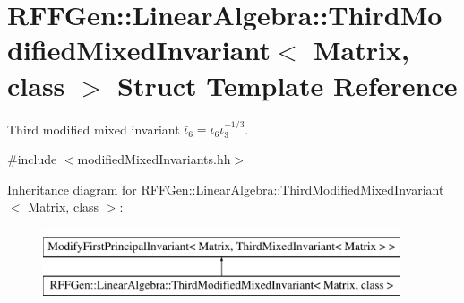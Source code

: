 \hypertarget{structRFFGen_1_1LinearAlgebra_1_1ThirdModifiedMixedInvariant}{\section{R\-F\-F\-Gen\-:\-:Linear\-Algebra\-:\-:Third\-Modified\-Mixed\-Invariant$<$ Matrix, class $>$ Struct Template Reference}
\label{structRFFGen_1_1LinearAlgebra_1_1ThirdModifiedMixedInvariant}
}


Third modified mixed invariant $\bar\iota_6=\iota_6\iota_3^{-1/3}$.  




{\ttfamily \#include $<$modified\-Mixed\-Invariants.\-hh$>$}

Inheritance diagram for R\-F\-F\-Gen\-:\-:Linear\-Algebra\-:\-:Third\-Modified\-Mixed\-Invariant$<$ Matrix, class $>$\-:\begin{figure}[H]
\begin{center}
\leavevmode
\includegraphics[height=2.000000cm]{structRFFGen_1_1LinearAlgebra_1_1ThirdModifiedMixedInvariant}
\end{center}
\end{figure}
